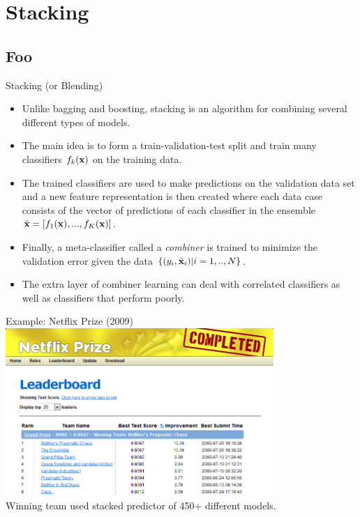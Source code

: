 \documentclass[serif,xcolor=pdftex,dvipsnames,table,hyperref={bookmarks=false,breaklinks}]{beamer}
\begin{document}
\section{Stacking}
\subsection{Foo}

\begin{frame}[t]{Stacking (or Blending)}

\begin{itemize}
\setlength{\itemsep}{8pt}

\item Unlike bagging and boosting, stacking is an algorithm for combining several different types of models.

\pause\item The main idea is to form a train-validation-test split and train many classifiers $f_k({\mathbf{x}})$ on the training data. 

\pause\item The trained classifiers are used to make predictions on the validation data set and
a new feature representation is then created where each data case consists of the vector of predictions of each classifier in the ensemble $\tilde{{\mathbf{x}}} = [f_1({\mathbf{x}}),...,f_K({\mathbf{x}})]$.

\pause\item Finally, a meta-classifier called a \textit{combiner} is trained to minimize the validation error given the data $\{(y_i,\tilde{{\mathbf{x}}}_i)|i=1,..,N\}$.

\pause\item The extra layer of combiner learning can deal with correlated classifiers as well 
as classifiers that perform poorly.

\end{itemize}
\end{frame}

\begin{frame}[t]{Example: Netflix Prize (2009)}
\vspace{-1em}
\center\includegraphics[width=4in]{../Figures/NetflixPrize.png}\\
\pause Winning team used stacked predictor of 450+ different models.
\end{frame}
\end{document}
